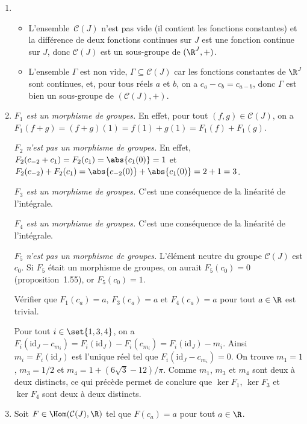\begin{enumerate}
  \item
    \begin{itemize}
      \item
        L'ensemble~$\mathcal{C}(J)$ n'est pas vide (il contient les fonctions constantes) et la différence de deux fonctions continues sur $J$ est une fonction continue sur $J$, donc $\mathcal{C}(J)$ est un sous-groupe de $(\R^J,+)$.

      \item
        L'ensemble $\Gamma$ est non vide, $\Gamma\subseteq\mathcal{C}(J)$ car les fonctions constantes de $\R^J$ sont continues, et, pour tous réels $a$ et $b$, on a $c_a - c_b = c_{a - b}$, donc $\Gamma$ est bien un sous-groupe de $(\mathcal{C}(J),+)$.
    \end{itemize}

  \item
    \emph{$F_1$ est un morphisme de groupes.}
    En effet, pour tout $(f,g)\in\mathcal{C}(J)$, on a $F_1(f + g) = (f + g)(1) = f(1) + g(1) = F_1(f) + F_1(g)$.

    \emph{$F_2$ n'est pas un morphisme de groupes.}
    En effet, $F_2(c_{-2} + c_1) = F_2(c_1) = \abs{c_1(0)} = 1$ et $F_2(c_{-2}) + F_2(c_1) = \abs{c_{-2}(0)} + \abs{c_1(0)} = 2 + 1 = 3$.

    \emph{$F_3$ est un morphisme de groupes.}
    C'est une conséquence de la linéarité de l'intégrale.

    \emph{$F_4$ est un morphisme de groupes.}
    C'est une conséquence de la linéarité de l'intégrale.

    \emph{$F_5$ n'est pas un morphisme de groupes.}
    L'élément neutre du groupe $\mathcal{C}(J)$ est $c_0$.
    Si $F_5$ était un morphisme de groupes, on aurait $F_5(c_0) = 0$ (proposition~1.55), or $F_5(c_0) = 1$.

    Vérifier que $F_1(c_a) = a$, $F_3(c_a) = a$ et $F_4(c_a) = a$ pour tout $a\in\R$ est trivial.

    Pour tout $i\in\set{1,3,4}$, on a $F_i(\mathrm{id}_J - c_{m_i}) = F_i(\mathrm{id}_J) - F_i(c_{m_i}) = F_i(\mathrm{id}_J) - m_i$.
    Ainsi $m_i = F_i(\mathrm{id}_J)$ est l'unique réel tel que $F_i(\mathrm{id}_J - c_{m_i}) = 0$.
    On trouve $m_1 = 1$, $m_3 = 1/2$ et $m_4 = 1 + (6\sqrt{3} - 12)/\pi$.
    Comme $m_1$, $m_3$ et $m_4$ sont deux à deux distincts, ce qui précède permet de conclure que $\ker F_1$, $\ker F_3$ et $\ker F_4$ sont deux à deux distincts.

  \item
    Soit $F\in\Hom(\mathcal{C}(J),\R)$ tel que $F(c_a) = a$ pour tout $a\in\R$.


\end{enumerate}
